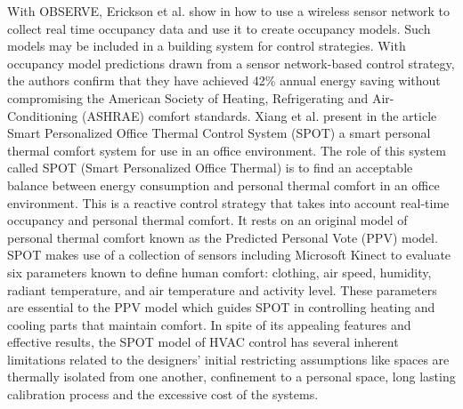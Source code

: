 With OBSERVE, Erickson et al. show in \cite{EricksonCarreiraPerpinan} how to use a wireless sensor network to collect real time occupancy data and use it to create occupancy models. Such models may be included in a building system for control strategies. With occupancy model predictions drawn from a sensor network-based control strategy, the authors confirm that they have achieved 42\% annual energy saving without compromising the American Society of Heating, Refrigerating and Air-Conditioning (ASHRAE) comfort standards.  Xiang et al. present in the article Smart Personalized Office Thermal Control System (SPOT) \cite{SPOT} a smart personal thermal comfort system for use in an office environment. The role of this system called SPOT (Smart Personalized Office Thermal) is to find an acceptable balance between energy consumption and personal thermal comfort in an office environment. This is a reactive control strategy that takes into account real-time occupancy and personal thermal comfort. It rests on an original model of personal thermal comfort known as the Predicted Personal Vote (PPV) model. SPOT makes use of a collection of sensors including Microsoft Kinect to evaluate six parameters known to define human comfort: clothing, air speed, humidity, radiant temperature, and air temperature and activity level. These parameters are essential to the PPV model which guides SPOT in controlling heating and cooling parts that maintain comfort. In spite of its appealing features and effective results, the SPOT model of HVAC control has several inherent limitations related to the designers’ initial restricting assumptions like  spaces are thermally isolated from one another, confinement to a personal space, long lasting calibration process and the excessive cost of the systems.

